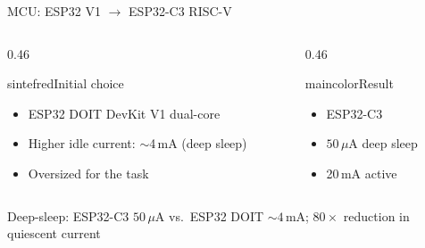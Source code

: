 \begin{frame}{MCU: ESP32 V1 $\rightarrow$ ESP32-C3 RISC-V}
\begin{columns}[T,onlytextwidth]
\begin{column}{0.46\textwidth}
  \begin{colorblock}[white]{sintefred}{Initial choice}
  \large
  \begin{itemize}
    \item ESP32 DOIT DevKit V1 dual-core
    \item Higher idle current: $\sim$4\,mA (deep sleep)
    \item Oversized for the task
  \end{itemize}
  \end{colorblock}
\end{column}
\begin{column}{0.46\textwidth}
  \begin{colorblock}[white]{maincolor}{Result}
  \large
  \begin{itemize}
    \item ESP32-C3 
    \item $50\,\mu\text{A}$ deep sleep
    \item 20\,mA active
  \end{itemize}
  \end{colorblock}
\end{column}
\end{columns}
\vspace{0.4cm}
\centering
\small Deep-sleep: ESP32-C3 $50\,\mu\text{A}$ vs.\ ESP32 DOIT ${\sim}4\,\text{mA}$; $80{\times}$ reduction in quiescent current
\end{frame}

